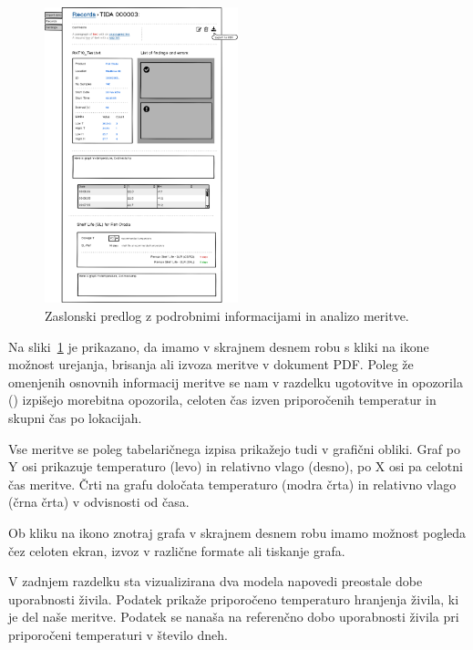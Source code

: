\documentclass[a4paper, 12pt]{book}
\begin{document}
\begin{figure}[h]
\begin{center}
\includegraphics[width=0.5\textwidth]{slike/Record-view.png}
\end{center}
\caption{Zaslonski predlog z podrobnimi informacijami in analizo meritve.}
\label{record-wireframe}
\end{figure}

Na sliki~\ref{record-wireframe} je prikazano, da imamo v skrajnem desnem robu s kliki na ikone možnost urejanja, brisanja ali izvoza meritve v dokument PDF.
Poleg že omenjenih osnovnih informacij meritve se nam v razdelku ugotovitve in opozorila () izpišejo morebitna opozorila, celoten čas izven priporočenih temperatur in skupni čas po lokacijah.

Vse meritve se poleg tabelaričnega izpisa prikažejo tudi v grafični obliki.
Graf po Y osi prikazuje temperaturo (levo) in relativno vlago (desno), po X osi pa celotni čas meritve. Črti na grafu določata temperaturo (modra črta) in relativno vlago (črna črta) v odvisnosti od časa.

Ob kliku na ikono znotraj grafa v skrajnem desnem robu imamo možnost pogleda čez celoten ekran, izvoz v različne formate ali tiskanje grafa.

V zadnjem razdelku sta vizualizirana dva modela napovedi preostale dobe uporabnosti živila. Podatek  prikaže priporočeno temperaturo hranjenja živila, ki je del naše meritve. Podatek  se nanaša na referenčno dobo uporabnosti živila pri priporočeni temperaturi v število dneh. 
\end{document}
